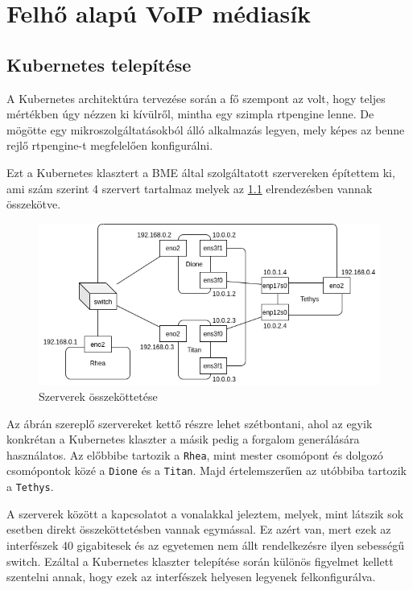 \chapter{Felhő alapú VoIP médiasík}

\section{Kubernetes telepítése}

A Kubernetes architektúra tervezése során a fő szempont az volt, hogy teljes mértékben 
úgy nézzen ki kívülről, mintha egy szimpla rtpengine lenne. De mögötte egy 
mikroszolgáltatásokból álló alkalmazás legyen, mely képes az benne rejlő rtpengine-t 
megfelelően konfigurálni.

Ezt a Kubernetes klasztert a BME által szolgáltatott szervereken építettem ki, ami szám 
szerint 4 szervert tartalmaz melyek az \ref{fig:servers} elrendezésben vannak összekötve.

\begin{figure}[!ht]
	\centering
	\includegraphics[width=1\textwidth, keepaspectratio]{figures/servers.png}
	\caption{Szerverek összeköttetése}
	\label{fig:servers}
\end{figure}

Az ábrán szereplő szervereket kettő részre lehet szétbontani, ahol az egyik
konkrétan a Kubernetes klaszter a másik pedig a forgalom generálására használatos.
Az előbbibe tartozik a \texttt{Rhea}, mint mester csomópont és dolgozó csomópontok közé 
a \texttt{Dione} és a \texttt{Titan}. Majd értelemszerűen az utóbbiba tartozik a 
\texttt{Tethys}. 

A szerverek között a kapcsolatot a vonalakkal jeleztem, melyek, mint látszik
sok esetben direkt összeköttetésben vannak egymással. Ez azért van, mert ezek
az interfészek 40 gigabitesek és az egyetemen nem állt rendelkezésre ilyen 
sebességű switch. Ezáltal a Kubernetes klaszter telepítése során különös figyelmet
kellett szentelni annak, hogy ezek az interfészek helyesen legyenek felkonfigurálva.

